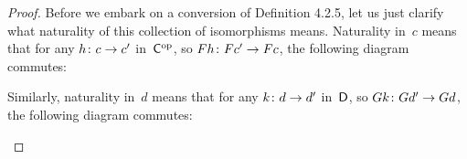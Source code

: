 \documentclass[../../solutions]{subfiles}
\begin{document}
\begin{proof}
  Before we embark on a conversion of Definition 4.2.5, let us just
  clarify what naturality of this collection of isomorphisms means.
  Naturality in~$c$ means that for any ${h}\colon{c}\to{c'}$ in~${\mathsf{C}}^{\mathrm{op}}$,
  so ${Fh}\colon{Fc'}\to{Fc}$, the following diagram commutes:
  \begin{center}
  \end{center}
  Similarly, naturality in~$d$ means that for any ${k}\colon{d}\to{d'}$
  in~${\mathsf{D}}$, so ${Gk}\colon{Gd'}\to{Gd}$, the following diagram commutes:
  \begin{center}
  \end{center}


\end{proof}
\end{document}
